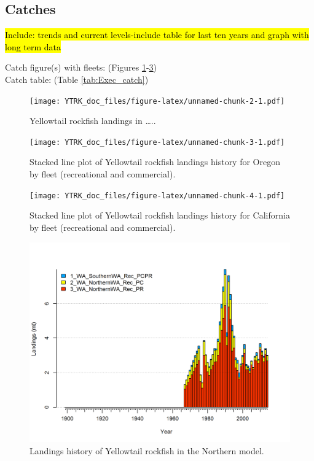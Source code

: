 \documentclass[12pt,]{article}
\begin{document}
\subsection*{Catches}\label{catches}

\hl{Include: trends and current levels-include table for last ten years and graph with 
long term data}

Catch figure(s) with fleets: (Figures
\ref{fig:Exec_catch1}-\ref{fig:Exec_catch3})\\
Catch table: (Table \ref{tab:Exec_catch})

\FloatBarrier

\begin{figure}[htbp]
\centering
\texttt{[image: YTRK\_doc\_files/figure-latex/unnamed-chunk-2-1.pdf]}
\caption{Yellowtail rockfish landings in \ldots{}..
\label{fig:Exec_catch1}}
\end{figure}

\begin{figure}[htbp]
\centering
\texttt{[image: YTRK\_doc\_files/figure-latex/unnamed-chunk-3-1.pdf]}
\caption{Stacked line plot of Yellowtail rockfish landings history for
Oregon by fleet (recreational and commercial). \label{fig:Exec_catch2}}
\end{figure}

\begin{figure}[htbp]
\centering
\texttt{[image: YTRK\_doc\_files/figure-latex/unnamed-chunk-4-1.pdf]}
\caption{Stacked line plot of Yellowtail rockfish landings history for
California by fleet (recreational and commercial).
\label{fig:Exec_catch3}}
\end{figure}

\FloatBarrier

\begin{figure}[htbp]
\centering
\includegraphics{r4ss/plots_mod1/catch2 landings stacked.png}
\caption{Landings history of Yellowtail rockfish in the Northern model.
\label{fig:r4ss_catches}}
\end{figure}
\end{document}
